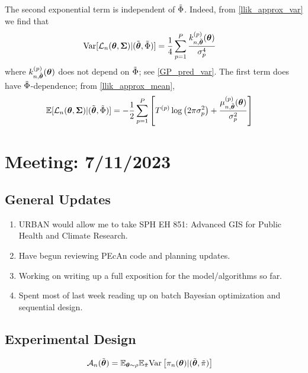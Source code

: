 \documentclass[12pt]{article}
\begin{document}
The second exponential term is independent of $\tilde{\Phi}$. Indeed, from \ref{llik_approx_var} we find that
\begin{align*}
\mathrm{Var}[\mathcal{L}_{n}(\boldsymbol{\theta}, \boldsymbol{\Sigma}) | (\tilde{\boldsymbol{\theta}}, \tilde{\Phi})] &= \frac{1}{4} \sum_{p = 1}^{P} \frac{k_{n, \tilde{\boldsymbol{\theta}}}^{(p)}(\boldsymbol{\theta})}{\sigma_{p}^4}
\end{align*}
where $k_{n, \tilde{\boldsymbol{\theta}}}^{(p)}(\boldsymbol{\theta})$ does not depend on $\tilde{\Phi}$; see \ref{GP_pred_var}. The first term does have $\tilde{\Phi}$-dependence; from \ref{llik_approx_mean},
\begin{align*}
\mathbb{E}[\mathcal{L}_{n}(\boldsymbol{\theta}, \boldsymbol{\Sigma}) | (\tilde{\boldsymbol{\theta}}, \tilde{\Phi})] &= -\frac{1}{2} \sum_{p = 1}^{P} \left[{T}^{(p)} \log\left(2\pi \sigma_{p}^2 \right) + \frac{\mu_{n, \tilde{\boldsymbol{\theta}}}^{(p)}(\boldsymbol{\theta})}{\sigma_{p}^2} \right]
\end{align*}



\section{Meeting: 7/11/2023}

\subsection{General Updates}
\begin{enumerate}
\item URBAN would allow me to take SPH EH 851: Advanced GIS for Public Health and Climate Research. 
\item Have begun reviewing PEcAn code and planning updates. 
\item Working on writing up a full exposition for the model/algorithms so far. 
\item Spent most of last week reading up on batch Bayesian optimization and sequential design. 
\end{enumerate}

\subsection{Experimental Design}
\begin{align*}
\mathcal{A}_{n}(\tilde{\boldsymbol{\theta}}) &= \mathbb{E}_{\boldsymbol{\theta} \sim \rho} \mathbb{E}_{\tilde{\pi}} \mathrm{Var}\left[\pi_{n}(\boldsymbol{\theta}) | (\tilde{\boldsymbol{\theta}}, \tilde{\pi}) \right] 
\end{align*}
\end{document}
